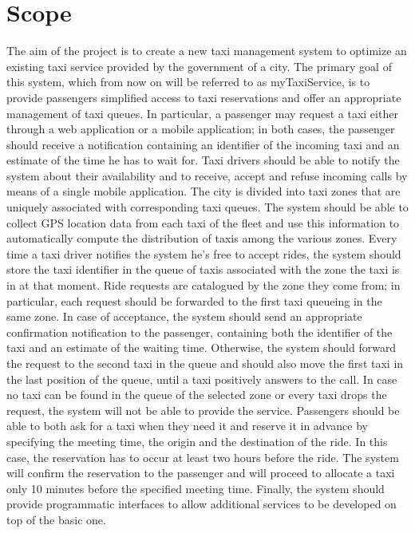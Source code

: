 \section{Scope}
The aim of the project is to create a new taxi management system to optimize an existing taxi service provided by the government of a city. The primary goal of this system, which from now on will be referred to as myTaxiService, is to provide passengers simplified access to taxi reservations and offer an appropriate management of taxi queues. In particular, a passenger may request a taxi either through a web application or a mobile application; in both cases, the passenger should receive a notification containing an identifier of the incoming taxi and an estimate of the time he has to wait for. Taxi drivers should be able to notify the system about their availability and to receive, accept and refuse incoming calls by means of a single mobile application. The city is divided into taxi zones that are uniquely associated with corresponding taxi queues. The system should be able to collect GPS location data from each taxi of the fleet and use this information to automatically compute the distribution of taxis among the various zones. Every time a taxi driver notifies the system he's free to accept rides, the system should store the taxi identifier in the queue of taxis associated with the zone the taxi is in at that moment. Ride requests are catalogued by the zone they come from; in particular, each request should be forwarded to the first taxi queueing in the same zone. In case of acceptance, the system should send an appropriate confirmation notification to the passenger, containing both the identifier of the taxi and an estimate of the waiting time. Otherwise, the system should forward the request to the second taxi in the queue and should also move the first taxi in the last position of the queue, until a taxi positively answers to the call. In case no taxi can be found in the queue of the selected zone or every taxi drops the request, the system will not be able to provide the service. Passengers should be able to both ask for a taxi when they need it and reserve it in advance by specifying the meeting time, the origin and the destination of the ride. In this case, the reservation has to occur at least two hours before the ride. The system will confirm the reservation to the passenger and will proceed to allocate a taxi only 10 minutes before the specified meeting time. Finally, the system should provide programmatic interfaces to allow additional services to be developed on top of the basic one.


